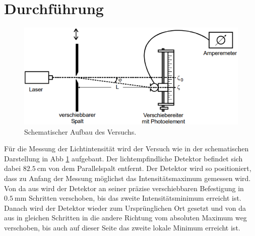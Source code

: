 \section{Durchführung}
\label{sec:Durchführung}

\begin{figure}
    \centering
    \includegraphics[width=\textwidth]{data/aufbau.png}
    \caption{Schematischer Aufbau des Versuchs.}
    \label{fig:aufbau}
\end{figure}

Für die Messung der Lichtintensität wird der Versuch wie in der schematischen Darstellung in Abb \ref{fig:aufbau} aufgebaut. Der 
lichtempfindliche Detektor befindet sich dabei $\SI{82.5}{\centi\metre} $ von dem Parallelspalt entfernt. Der Detektor wird so positioniert, 
dass zu Anfang der Messung möglichst das Intensitätsmaximum gemessen wird. Von da aus wird der Detektor an seiner präzise verschiebbaren 
Befestigung in $\SI{0.5}{\milli\metre} $ Schritten verschoben, bis das zweite Intensitätsminimum erreicht ist. Danach wird der Detektor
wieder zum Ursprünglichen Ort gesetzt und von da aus in gleichen Schritten in die andere Richtung vom absoluten Maximum weg verschoben, 
bis auch auf dieser Seite das zweite lokale Minimum erreicht ist. 
